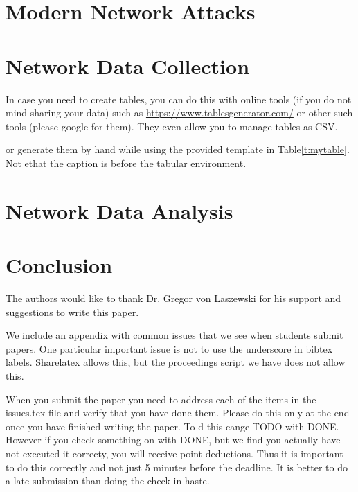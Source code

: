 \documentclass[sigconf]{acmart}
\begin{document}
\section{Modern Network Attacks}



\section{Network Data Collection}

In case you need to create tables, you can do this with online tools
(if you do not mind sharing your data) such as
\url{https://www.tablesgenerator.com/} or other such tools (please
google for them). They even allow you to manage tables as CSV.

or generate them by hand while using the provided template in Table\ref{t:mytable}. Not ethat
the caption is before the tabular environment.



\section{Network Data Analysis}



\section{Conclusion}




\begin{acks}

  The authors would like to thank Dr. Gregor von Laszewski for his
  support and suggestions to write this paper.

\end{acks}


 

\appendix

We include an appendix with common issues that we see when students
submit papers. One particular important issue is not to use the
underscore in bibtex labels. Sharelatex allows this, but the
proceedings script we have does not allow this.

When you submit the paper you need to address each of the items in the
issues.tex file and verify that you have done them. Please do this
only at the end once you have finished writing the paper. To d this
cange TODO with DONE. However if you check something on with DONE, but
we find you actually have not executed it correcty, you will receive
point deductions. Thus it is important to do this correctly and not
just 5 minutes before the deadline. It is better to do a late
submission than doing the check in haste. 


\end{document}
